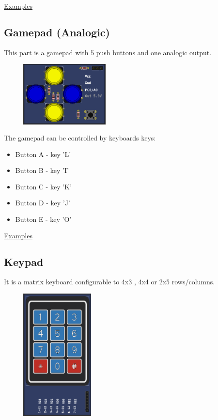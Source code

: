\href{https://lcgamboa.github.io/picsimlab_examples/Parts.html\#Gamepad}{Examples}

\subsection{Gamepad (Analogic)}

This part is a gamepad with 5 push buttons and one analogic output.

\begin{figure}[H]
\center
\includegraphics[width=0.4\textwidth]{img/part_gamepad_an.png} 
\end{figure} 


The gamepad can be controlled by keyboards keys:
\begin{itemize}
 \item Button A - key 'L'
 \item Button B - key 'I'
 \item Button C - key 'K'
 \item Button D - key 'J'
 \item Button E - key 'O'
 \end{itemize}


\href{https://lcgamboa.github.io/picsimlab_examples/Parts.html\#Gamepad_(Analogic)}{Examples}

\subsection{Keypad}

It is a matrix keyboard configurable to 4x3 , 4x4 or 2x5 rows/columns.

\begin{figure}[H]
\center
\includegraphics[width=0.33\textwidth]{img/part_keyb_4x3.png} 
\end{figure} 

